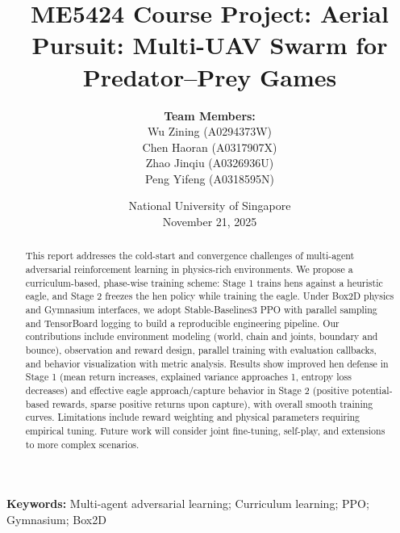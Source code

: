 \documentclass[12pt]{article}
\begin{document}
\hypersetup{pageanchor=false}
\renewcommand{\contentsname}{Table of Contents}
\renewcommand{\abstractname}{Abstract}
\renewcommand{\refname}{References}
\renewcommand{\figurename}{Figure}
\renewcommand{\tablename}{Table}
\begin{titlepage}
\centering
\title{ME5424 Course Project: Aerial Pursuit: Multi-UAV Swarm for Predator–Prey Games}
\author{\textbf{Team Members:}\\Wu Zining (A0294373W)\\Chen Haoran (A0317907X)\\Zhao Jinqiu (A0326936U)\\Peng Yifeng (A0318595N)}
\date{National University of Singapore\\November 21, 2025}
\maketitle
\vfill
\end{titlepage}
\hypersetup{pageanchor=true}

\tableofcontents
\bigskip
\newpage
\begin{abstract}
This report addresses the cold-start and convergence challenges of multi-agent adversarial reinforcement learning in physics-rich environments. We propose a curriculum-based, phase-wise training scheme: Stage 1 trains hens against a heuristic eagle, and Stage 2 freezes the hen policy while training the eagle. Under Box2D physics and Gymnasium interfaces, we adopt Stable-Baselines3 PPO with parallel sampling and TensorBoard logging to build a reproducible engineering pipeline. Our contributions include environment modeling (world, chain and joints, boundary and bounce), observation and reward design, parallel training with evaluation callbacks, and behavior visualization with metric analysis. Results show improved hen defense in Stage 1 (mean return increases, explained variance approaches 1, entropy loss decreases) and effective eagle approach/capture behavior in Stage 2 (positive potential-based rewards, sparse positive returns upon capture), with overall smooth training curves. Limitations include reward weighting and physical parameters requiring empirical tuning. Future work will consider joint fine-tuning, self-play, and extensions to more complex scenarios.
\end{abstract}

\textbf{Keywords:} Multi-agent adversarial learning; Curriculum learning; PPO; Gymnasium; Box2D
\end{document}
